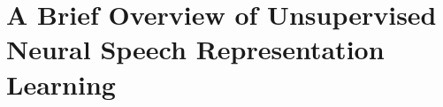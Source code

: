 
\chapter[a brief overview of unsupervised neural speech representation learning]{A Brief Overview of Unsupervised Neural Speech Representation Learning}
\label{chp:appendix-paper-brief}
